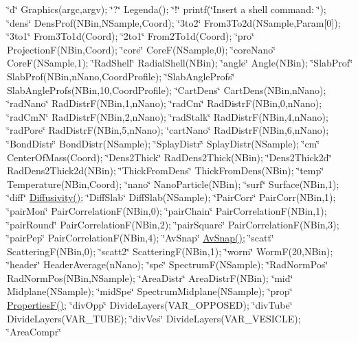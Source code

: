 \char`\"{}d\char`\"{} Graphics(argc,argv); \char`\"{}?\char`\"{} Legenda(); \char`\"{}!\char`\"{} printf(\char`\"{}\+Insert a shell command\+: \char`\"{}); \char`\"{}dens\char`\"{} Dens\+Prof(\+N\+Bin,\+N\+Sample,\+Coord); \char`\"{}3to2\char`\"{} From3\+To2d(\+N\+Sample,\+Param\mbox{[}0\mbox{]}); \char`\"{}3to1\char`\"{} From3\+To1d(\+Coord); \char`\"{}2to1\char`\"{} From2\+To1d(\+Coord); \char`\"{}pro\char`\"{} Projection\+F(\+N\+Bin,\+Coord); \char`\"{}core\char`\"{} Core\+F(\+N\+Sample,0); \char`\"{}core\+Nano\char`\"{} Core\+F(\+N\+Sample,1); \char`\"{}\+Rad\+Shell\char`\"{} Radial\+Shell(\+N\+Bin); \char`\"{}angle\char`\"{} Angle(\+N\+Bin); \char`\"{}\+Slab\+Prof\char`\"{} Slab\+Prof(\+N\+Bin,n\+Nano,\+Coord\+Profile); \char`\"{}\+Slab\+Angle\+Profs\char`\"{} Slab\+Angle\+Profs(\+N\+Bin,10,\+Coord\+Profile); \char`\"{}\+Cart\+Dens\char`\"{} Cart\+Dens(\+N\+Bin,n\+Nano); \char`\"{}rad\+Nano\char`\"{} Rad\+Distr\+F(\+N\+Bin,1,n\+Nano); \char`\"{}rad\+Cm\char`\"{} Rad\+Distr\+F(\+N\+Bin,0,n\+Nano); \char`\"{}rad\+Cm\+N\char`\"{} Rad\+Distr\+F(\+N\+Bin,2,n\+Nano); \char`\"{}rad\+Stalk\char`\"{} Rad\+Distr\+F(\+N\+Bin,4,n\+Nano); \char`\"{}rad\+Pore\char`\"{} Rad\+Distr\+F(\+N\+Bin,5,n\+Nano); \char`\"{}cart\+Nano\char`\"{} Rad\+Distr\+F(\+N\+Bin,6,n\+Nano); \char`\"{}\+Bond\+Distr\char`\"{} Bond\+Distr(\+N\+Sample); \char`\"{}\+Splay\+Distr\char`\"{} Splay\+Distr(\+N\+Sample); \char`\"{}cm\char`\"{} Center\+Of\+Mass(\+Coord); \char`\"{}\+Dens2\+Thick\char`\"{} Rad\+Dens2\+Thick(\+N\+Bin); \char`\"{}\+Dens2\+Thick2d\char`\"{} Rad\+Dens2\+Thick2d(\+N\+Bin); \char`\"{}\+Thick\+From\+Dens\char`\"{} Thick\+From\+Dens(\+N\+Bin); \char`\"{}temp\char`\"{} Temperature(\+N\+Bin,\+Coord); \char`\"{}nano\char`\"{} Nano\+Particle(\+N\+Bin); \char`\"{}surf\char`\"{} Surface(\+N\+Bin,1); \char`\"{}diff\char`\"{} \hyperlink{classElPoly_a2f4aa8dc1e4dce0dc8fcb1d4b161757b}{Diffusivity()}; \char`\"{}\+Diff\+Slab\char`\"{} Diff\+Slab(\+N\+Sample); \char`\"{}\+Pair\+Corr\char`\"{} Pair\+Corr(\+N\+Bin,1); \char`\"{}pair\+Mon\char`\"{} Pair\+Correlation\+F(\+N\+Bin,0); \char`\"{}pair\+Chain\char`\"{} Pair\+Correlation\+F(\+N\+Bin,1); \char`\"{}pair\+Round\char`\"{} Pair\+Correlation\+F(\+N\+Bin,2); \char`\"{}pair\+Square\char`\"{} Pair\+Correlation\+F(\+N\+Bin,3); \char`\"{}pair\+Pep\char`\"{} Pair\+Correlation\+F(\+N\+Bin,4); \char`\"{}\+Av\+Snap\char`\"{} \hyperlink{classElPoly_aafe33ef0f28995ba7c1a778196decf9b}{Av\+Snap()}; \char`\"{}scatt\char`\"{} Scattering\+F(\+N\+Bin,0); \char`\"{}scatt2\char`\"{} Scattering\+F(\+N\+Bin,1); \char`\"{}worm\char`\"{} Worm\+F(20,\+N\+Bin); \char`\"{}header\char`\"{} Header\+Average(n\+Nano); \char`\"{}spe\char`\"{} Spectrum\+F(\+N\+Sample); \char`\"{}\+Rad\+Norm\+Pos\char`\"{} Rad\+Norm\+Pos(\+N\+Bin,\+N\+Sample); \char`\"{}\+Area\+Distr\char`\"{} Area\+Distr\+F(\+N\+Bin); \char`\"{}mid\char`\"{} Midplane(\+N\+Sample); \char`\"{}mid\+Spe\char`\"{} Spectrum\+Midplane(\+N\+Sample); \char`\"{}prop\char`\"{} \hyperlink{classElPoly_ae41ade7fbfd977babf42a7e2e6b33f07}{Properties\+F()}; \char`\"{}div\+Opp\char`\"{} Divide\+Layers(\+V\+A\+R\+\_\+\+O\+P\+P\+O\+S\+E\+D); \char`\"{}div\+Tube\char`\"{} Divide\+Layers(\+V\+A\+R\+\_\+\+T\+U\+B\+E); \char`\"{}div\+Ves\char`\"{} Divide\+Layers(\+V\+A\+R\+\_\+\+V\+E\+S\+I\+C\+L\+E); \char`\"{}\+Area\+Compr\char`\"{} 